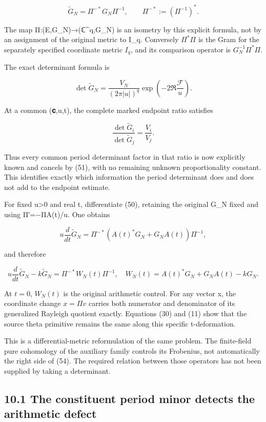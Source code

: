 \documentclass[
  11pt,
]{article}
\begin{document}
\[
\widetilde G_N=\Pi^{-*}G_N\Pi^{-1},
\qquad
\Pi^{-*}:=(\Pi^{-1})^*.
\tag{50}
\]

The map Π:(E,G\_N)→(ℂ\^{}q,\widetilde G\_N) is an isometry by this
explicit formula, not by an assignment of the original metric to I\_q.
Conversely $\Pi^*\Pi$ is the Gram for the separately specified coordinate metric $I_q$, and its comparison operator is $G_N^{-1}\Pi^*\Pi$.

The exact determinant formula is

\[
\boxed{
\det\widetilde G_N
 =\frac{V_N}{(2\pi|u|)^q}
 \exp\!\left(-2\Re\frac{\mathcal F}u\right).
}
\tag{51}
\]

At a common (𝐜,u,t), the complete marked endpoint ratio satisfies

\[
\boxed{
\frac{\det\widetilde G_i}{\det\widetilde G_j}
 =\frac{V_i}{V_j}.
}
\tag{52}
\]

Thus every common period determinant factor in that ratio is now
explicitly known and cancels by (51), with no remaining unknown
proportionality constant. This identifies exactly which information the
period determinant does and does not add to the endpoint estimate.

For fixed u\textgreater0 and real t, differentiate (50), retaining the
original G\_N fixed and using Π′=−ΠA(t)/u. One obtains

\[
u\frac{d}{dt}\widetilde G_N
 =\Pi^{-*}(A(t)^*G_N+G_NA(t))\Pi^{-1},
\tag{53}
\]

and therefore

\[
\boxed{
 u\frac{d}{dt}\widetilde G_N-k\widetilde G_N
 =\Pi^{-*}W_N(t)\Pi^{-1},
\quad W_N(t)=A(t)^*G_N+G_NA(t)-kG_N.
}
\tag{54}
\]

At \(t=0\), \(W_N(t)\) is the original arithmetic control. For any
vector x, the coordinate change \(x=\Pi v\) carries both numerator and
denominator of its generalized Rayleigh quotient exactly. Equations (30)
and (11) show that the source theta primitive remains the same along
this specific t-deformation.

This is a differential-metric reformulation of the same problem. The
finite-field pure cohomology of the auxiliary family controls its
Frobenius, not automatically the right side of (54). The required
relation between those operators has not been supplied by taking a
determinant.

\subsection{10.1 The constituent period minor detects the arithmetic
defect}\label{the-constituent-period-minor-detects-the-arithmetic-defect}
\end{document}

